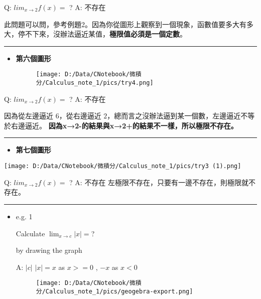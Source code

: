 \documentclass[]{article}
\begin{document}
Q: \(lim _{x\rightarrow  {2}}f(x)= \) ? A: 不存在

此問題可以問，參考例題2。因為你從圖形上觀察到一個現象，函數值要多大有多大，停不下來，沒辦法逼近某值，\textbf{極限值必須是一個定數}。

\begin{center}\rule{0.5\linewidth}{\linethickness}\end{center}

\begin{itemize}
\item
  \textbf{第六個圖形}

  \begin{figure}
  \centering
  \texttt{[image: D:/Data/CNotebook/微積分/Calculus\_note\_1/pics/try4.png]}
  \caption{}
  \end{figure}
\end{itemize}

Q: \(lim _{x\rightarrow  {2}}f(x)= \) ? A: 不存在

因為從左邊逼近 \(6\)，從右邊逼近
\(2\)，總而言之沒辦法逼到某一個數，左邊逼近不等於右邊逼近。
\textbf{因為x→2-的結果與x→2+的結果不一樣，所以極限不存在。}

\begin{center}\rule{0.5\linewidth}{\linethickness}\end{center}

\begin{itemize}
\item
  \textbf{第七個圖形}
\end{itemize}

\texttt{[image: D:/Data/CNotebook/微積分/Calculus\_note\_1/pics/try3 (1).png]}

Q: \(lim _{x\rightarrow  {2}}f(x)= \) ? A: 不存在
左極限不存在，只要有一邊不存在，則極限就不存在。

\begin{center}\rule{0.5\linewidth}{\linethickness}\end{center}

\begin{itemize}
\item
  e.g. 1

  Calculate \(\lim _{x\rightarrow c}\left| x\right| =\)?

  by drawing the graph

  A: \(|c|\) \(|x|= x\) as \(x>=0\) , \(-x\) as \(x<0\)

  \begin{figure}
  \centering
  \texttt{[image: D:/Data/CNotebook/微積分/Calculus\_note\_1/pics/geogebra-export.png]}
  \caption{}
  \end{figure}
\end{itemize}
\end{document}
